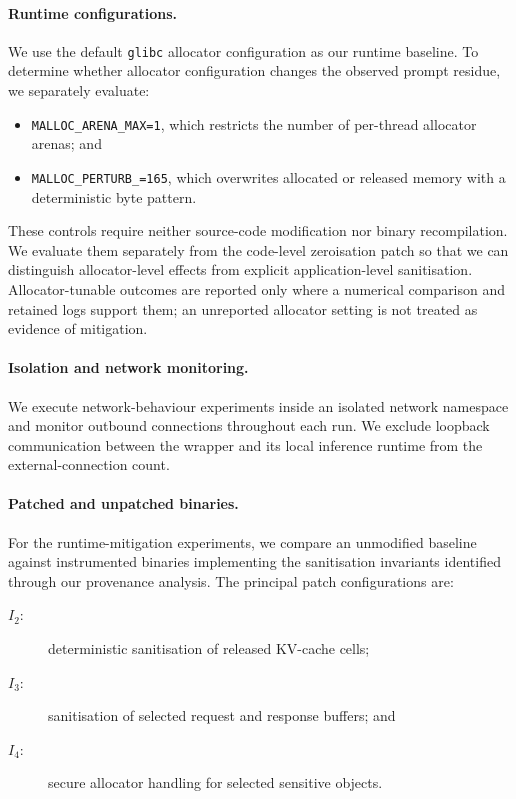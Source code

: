 \paragraph{Runtime configurations.}
We use the default \texttt{glibc} allocator configuration as our runtime
baseline. To determine whether allocator configuration changes the
observed prompt residue, we separately evaluate:

\begin{itemize}
    \item \texttt{MALLOC\_ARENA\_MAX=1}, which restricts the number of
    per-thread allocator arenas; and
    \item \texttt{MALLOC\_PERTURB\_=165}, which overwrites allocated or
    released memory with a deterministic byte pattern.
\end{itemize}

These controls require neither source-code modification nor binary
recompilation. We evaluate them separately from the code-level
zeroisation patch so that we can distinguish allocator-level effects
from explicit application-level sanitisation. Allocator-tunable outcomes are
reported only where a numerical comparison and retained logs support them; an
unreported allocator setting is not treated as evidence of mitigation.

\paragraph{Isolation and network monitoring.}
We execute network-behaviour experiments inside an isolated network
namespace and monitor outbound connections throughout each run. We
exclude loopback communication between the wrapper and its local
inference runtime from the external-connection count.

\paragraph{Patched and unpatched binaries.}
For the runtime-mitigation experiments, we compare an unmodified baseline
against instrumented binaries implementing the sanitisation invariants
identified through our provenance analysis. The principal patch
configurations are:

\begin{description}
    \item[$I_2$:] deterministic sanitisation of released KV-cache cells;
    \item[$I_3$:] sanitisation of selected request and response buffers;
    and
    \item[$I_4$:] secure allocator handling for selected sensitive
    objects.
\end{description}

